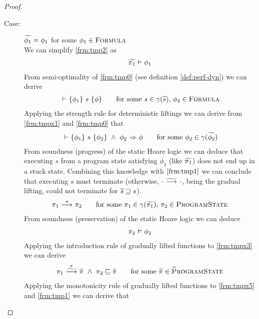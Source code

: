 \begin{proof}
    \begin{description}
        \item[Case:] $\widetilde{\phi_1} = \phi_1$ for some $\phi_1 \in \textup{\textsc{Formula}}$~\\
        We can simplify \ref{frm:tmp2} as
        \begin{align}
        \label{frm:tmpx0}
        \evalphiGen{\grad{\pi_1}}{\phi_1}
        \end{align}
        From semi-optimality of \ref{frm:tmp0} (see definition \ref{def:perf-dyn}) we can derive
        \begin{align}
        \label{frm:tmpx1}
        \thoare{}{\phi_1}{s}{\phi}
        \quad\quad\text{for some } s \in \gamma(\grad{s}),\, \phi_2 \in \setFormula
        \end{align}
        Applying the strength rule for deterministic liftings we can derive from \ref{frm:tmpx1} and \ref{frm:tmp0} that
        \begin{align}
        \label{frm:tmpx2}
        \thoare{}{\phi_1}{s}{\phi_2} ~\wedge~ \phiImplies{\phi_2}{\phi}
        \quad\quad\text{for some } \phi_2 \in \gamma(\grad{\phi_2})
        \end{align}
        From soundness (progress) of the static Hoare logic we can deduce that executing $s$ from a program state satisfying $\phi_1$ (like $\widetilde{\pi_1}$) does not end up in a stuck state.
        Combining this knowledge with $\ref{frm:tmp1}$ we can conclude that executing $s$ must terminate (otherwise, ${\cdot} \,\,{\widetilde{\longrightarrow}^{}}\,\, {\cdot}$, being the gradual lifting, could not terminate for $\widetilde{s} \sqsupseteq s$).
        \begin{align}
        \label{frm:tmpx3}
        \sstepConsume{s}{\pi_1}{\pi_2}
        \quad\quad\text{for some } \pi_1 \in \gamma(\grad{\pi_1}),\, \pi_2 \in \setProgramState
        \end{align}
        From soundness (preservation) of the static Hoare logic we can deduce
        \begin{align}
        \label{frm:tmpx4}
        \evalphiGen{\pi_2}{\phi_2}
        \end{align}
        Applying the introduction rule of gradually lifted functions to \ref{frm:tmpx3} we can derive
        \begin{align}
        \label{frm:tmpx5}
        \gsstepConsume{s}{\pi_1}{\grad{\pi}} ~\wedge~ \pi_2 \sqsubseteq \grad{\pi}
        \quad\quad\text{for some } \grad{\pi} \in \setGProgramState
        \end{align}
        Applying the monotonicity rule of gradually lifted functions to \ref{frm:tmpx5} and \ref{frm:tmp1} we can derive that

\end{description}
\end{proof}
